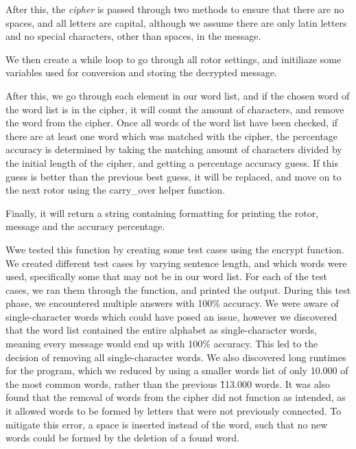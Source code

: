 \documentclass{article}
\begin{document}
After this, the \textit{cipher} is passed through two methods to ensure that there are no spaces, and all letters are capital, 
although we assume there are only latin letters and no special characters, other than spaces, in the message.

We then create a while loop to go through all rotor settings, and initiliaze some variables used for conversion and storing the decrypted message.

After this, we go through each element in our word list, and if the chosen word of the word list is in the cipher, it will count the amount of characters, and remove the word from the cipher.
Once all words of the word list have been checked, if there are at least one word which was matched with the cipher, the percentage accuracy is determined by taking the matching amount
of characters divided by the initial length of the cipher, and getting a percentage accuracy guess.
If this guess is better than the previous best guess, it will be replaced, and move on to the next rotor using the carry\_over helper function.

Finally, it will return a string containing formatting for printing the rotor, message and the accuracy percentage.

Wwe tested this function by creating some test cases using the encrypt function.
We created different test cases by varying sentence length, and which words were used, specifically some that may not be in our word list.
For each of the test cases, we ran them through the function, and printed the output. During this test phase,
we encountered multiple answers with 100\% accuracy. We were aware of single-character words which could have posed an issue, however
we discovered that the word list contained the entire alphabet as single-character words, meaning every message would end up with 100\% accuracy.
This led to the decision of removing all single-character words. We also discovered long runtimes for the program, which we reduced by using a
smaller words list of only 10.000 of the most common words, rather than the previous \~113.000 words.
It was also found that the removal of words from the cipher did not function as intended, as it allowed words to be formed by letters that were not previously connected.
To mitigate this error, a space is inserted instead of the word, such that no new words could be formed by the deletion of a found word.
\end{document}
